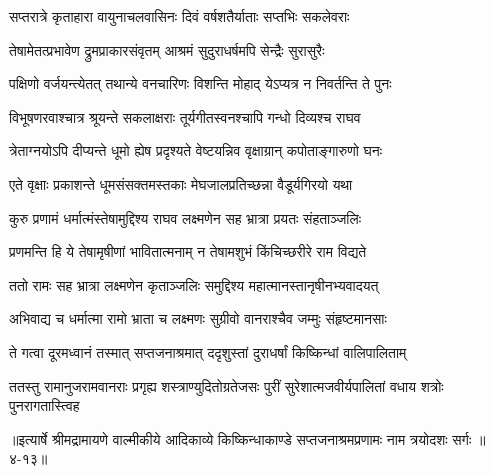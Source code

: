 \twolineshloka
{सप्तरात्रे कृताहारा वायुनाचलवासिनः}
{दिवं वर्षशतैर्याताः सप्तभिः सकलेवराः} %

\twolineshloka
{तेषामेतत्प्रभावेण द्रुमप्राकारसंवृतम्}
{आश्रमं सुदुराधर्षमपि सेन्द्रैः सुरासुरैः} %

\twolineshloka
{पक्षिणो वर्जयन्त्येतत् तथान्ये वनचारिणः}
{विशन्ति मोहाद् येऽप्यत्र न निवर्तन्ति ते पुनः} %

\twolineshloka
{विभूषणरवाश्चात्र श्रूयन्ते सकलाक्षराः}
{तूर्यगीतस्वनश्चापि गन्धो दिव्यश्च राघव} %

\twolineshloka
{त्रेताग्नयोऽपि दीप्यन्ते धूमो ह्येष प्रदृश्यते}
{वेष्टयन्निव वृक्षाग्रान् कपोताङ्गारुणो घनः} %

\twolineshloka
{एते वृक्षाः प्रकाशन्ते धूमसंसक्तमस्तकाः}
{मेघजालप्रतिच्छन्ना वैडूर्यगिरयो यथा} %

\twolineshloka
{कुरु प्रणामं धर्मात्मंस्तेषामुद्दिश्य राघव}
{लक्ष्मणेन सह भ्रात्रा प्रयतः संहताञ्जलिः} %

\twolineshloka
{प्रणमन्ति हि ये तेषामृषीणां भावितात्मनाम्}
{न तेषामशुभं किंचिच्छरीरे राम विद्यते} %

\twolineshloka
{ततो रामः सह भ्रात्रा लक्ष्मणेन कृताञ्जलिः}
{समुद्दिश्य महात्मानस्तानृषीनभ्यवादयत्} %

\twolineshloka
{अभिवाद्य च धर्मात्मा रामो भ्राता च लक्ष्मणः}
{सुग्रीवो वानराश्चैव जम्मुः संहृष्टमानसाः} %

\twolineshloka
{ते गत्वा दूरमध्वानं तस्मात् सप्तजनाश्रमात्}
{ददृशुस्तां दुराधर्षां किष्किन्धां वालिपालिताम्} %

\twolineshloka
{ततस्तु रामानुजरामवानराः प्रगृह्य शस्त्राण्युदितोग्रतेजसः}
{पुरीं सुरेशात्मजवीर्यपालितां वधाय शत्रोः पुनरागतास्त्विह} %


॥इत्यार्षे श्रीमद्रामायणे वाल्मीकीये आदिकाव्ये किष्किन्धाकाण्डे सप्तजनाश्रमप्रणामः नाम त्रयोदशः सर्गः ॥४-१३॥
